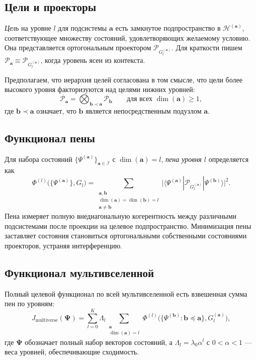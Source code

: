 \documentclass[11pt]{article}
\newcommand{\cP}{\mathcal{P}}
\newcommand{\cH}{\mathcal{H}}
\newcommand{\cI}{\mathcal{I}}
\begin{document}
\subsection{Цели и проекторы}
\emph{Цель} на уровне $l$ для подсистемы $\mathbf{a}$ есть замкнутое подпространство в $\cH^{(\mathbf{a})}$, соответствующее множеству состояний, удовлетворяющих желаемому условию. Она представляется ортогональным проектором $\cP_{G_l^{(\mathbf{a})}}$. Для краткости пишем $\cP_{\mathbf{a}} \equiv \cP_{G_l^{(\mathbf{a})}}$, когда уровень ясен из контекста.

Предполагаем, что иерархия целей согласована в том смысле, что цели более высокого уровня факторизуются над целями нижних уровней:
\begin{equation}
\cP_{\mathbf{a}} = \bigotimes_{\mathbf{b} \prec \mathbf{a}} \cP_{\mathbf{b}} \qquad \text{для всех } \dim(\mathbf{a}) \ge 1,
\label{eq:factorisation}
\end{equation}
где $\mathbf{b} \prec \mathbf{a}$ означает, что $\mathbf{b}$ является непосредственным подузлом $\mathbf{a}$.

\subsection{Функционал пены}
Для набора состояний $\{\Psi^{(\mathbf{a})}\}_{\mathbf{a} \in \cI}$ с $\dim(\mathbf{a})=l$, \emph{пена уровня $l$} определяется как
\begin{equation}
\Phi^{(l)}\bigl(\{\Psi^{(\mathbf{a})}\}, G_l\bigr) = 
\sum_{\substack{\mathbf{a},\mathbf{b} \\ \dim(\mathbf{a})=\dim(\mathbf{b})=l \\ \mathbf{a}\neq \mathbf{b}}}
\bigl| \langle \Psi^{(\mathbf{a})} | \cP_{G_l^{(\mathbf{a})}} | \Psi^{(\mathbf{b})} \rangle \bigr|^2.
\label{eq:foam_def}
\end{equation}
Пена измеряет полную внедиагональную когерентность между различными подсистемами после проекции на целевое подпространство. Минимизация пены заставляет состояния становиться ортогональными собственными состояниями проекторов, устраняя интерференцию.

\subsection{Функционал мультивселенной}
Полный целевой функционал по всей мультивселенной есть взвешенная сумма пен по уровням:
\begin{equation}
J_{\text{multiverse}}(\mathbf{\Psi}) = \sum_{l=0}^{K} \Lambda_l \sum_{\substack{\mathbf{a} \\ \dim(\mathbf{a})=l}} \Phi^{(l)}\bigl(\{\Psi^{(\mathbf{b})} : \mathbf{b} \preceq \mathbf{a}\}, G_l^{(\mathbf{a})}\bigr),
\label{eq:J_total}
\end{equation}
где $\mathbf{\Psi}$ обозначает полный набор векторов состояний, а $\Lambda_l = \lambda_0 \alpha^l$ с $0 < \alpha < 1$ --- веса уровней, обеспечивающие сходимость.
\end{document}
